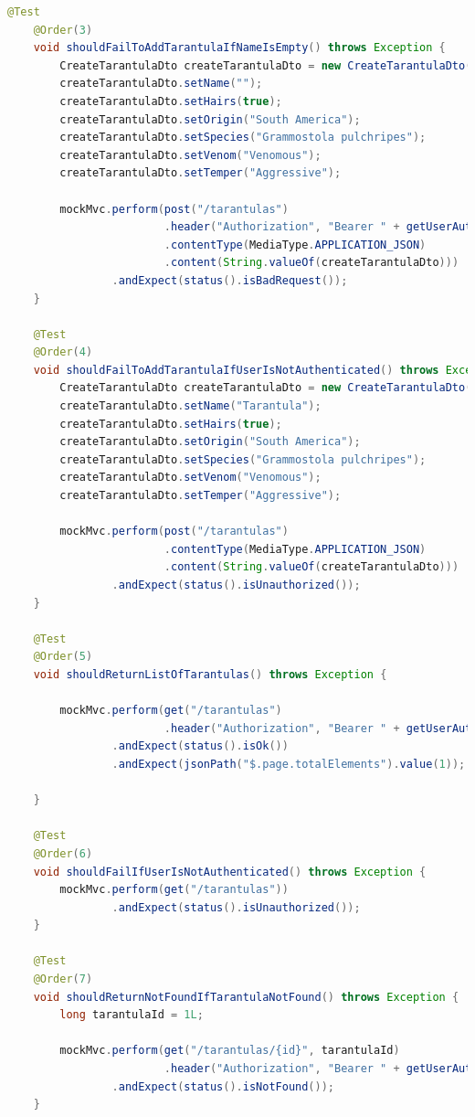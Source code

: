 \documentclass[a4paper,12pt,oneside]{article}
\begin{document}
\begin{lstlisting}[language=Java]
    @Test
    @Order(3)
    void shouldFailToAddTarantulaIfNameIsEmpty() throws Exception {
        CreateTarantulaDto createTarantulaDto = new CreateTarantulaDto();
        createTarantulaDto.setName("");
        createTarantulaDto.setHairs(true);
        createTarantulaDto.setOrigin("South America");
        createTarantulaDto.setSpecies("Grammostola pulchripes");
        createTarantulaDto.setVenom("Venomous");
        createTarantulaDto.setTemper("Aggressive");

        mockMvc.perform(post("/tarantulas")
                        .header("Authorization", "Bearer " + getUserAuthToken())
                        .contentType(MediaType.APPLICATION_JSON)
                        .content(String.valueOf(createTarantulaDto)))
                .andExpect(status().isBadRequest());
    }

    @Test
    @Order(4)
    void shouldFailToAddTarantulaIfUserIsNotAuthenticated() throws Exception {
        CreateTarantulaDto createTarantulaDto = new CreateTarantulaDto();
        createTarantulaDto.setName("Tarantula");
        createTarantulaDto.setHairs(true);
        createTarantulaDto.setOrigin("South America");
        createTarantulaDto.setSpecies("Grammostola pulchripes");
        createTarantulaDto.setVenom("Venomous");
        createTarantulaDto.setTemper("Aggressive");

        mockMvc.perform(post("/tarantulas")
                        .contentType(MediaType.APPLICATION_JSON)
                        .content(String.valueOf(createTarantulaDto)))
                .andExpect(status().isUnauthorized());
    }

    @Test
    @Order(5)
    void shouldReturnListOfTarantulas() throws Exception {

        mockMvc.perform(get("/tarantulas")
                        .header("Authorization", "Bearer " + getUserAuthToken()))
                .andExpect(status().isOk())
                .andExpect(jsonPath("$.page.totalElements").value(1));

    }

    @Test
    @Order(6)
    void shouldFailIfUserIsNotAuthenticated() throws Exception {
        mockMvc.perform(get("/tarantulas"))
                .andExpect(status().isUnauthorized());
    }

    @Test
    @Order(7)
    void shouldReturnNotFoundIfTarantulaNotFound() throws Exception {
        long tarantulaId = 1L;

        mockMvc.perform(get("/tarantulas/{id}", tarantulaId)
                        .header("Authorization", "Bearer " + getUserAuthToken()))
                .andExpect(status().isNotFound());
    }


\end{lstlisting}
\end{document}
